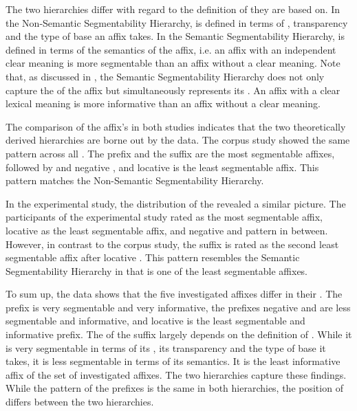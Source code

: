 The two hierarchies differ with regard to the definition of  they are based on. %
In the Non-Semantic Segmentability Hierarchy,  is defined in terms of , transparency and the type of base an affix takes. In the Semantic Segmentability Hierarchy,  is defined in terms of the semantics of the affix, i.e. an affix with an independent clear meaning is more segmentable than an affix without a clear meaning. Note that, as discussed in , the Semantic Segmentability Hierarchy does not only capture the  of the affix but simultaneously represents its . An affix with a clear lexical meaning is more informative than an affix without a clear meaning.


The comparison of the affix's  in both studies indicates that the two theoretically derived  hierarchies are borne out by the data.
 The corpus study showed the same  pattern across all .
 The prefix  and the suffix  are the most segmentable affixes, followed by  and negative , and locative  is the least segmentable affix. This pattern matches the Non-Semantic Segmentability Hierarchy.


In the experimental study, the distribution of the  revealed a similar picture. The participants of the experimental study rated  as the most segmentable affix, locative  as the least segmentable affix, and negative  and  pattern in between. However, in contrast to the corpus study, the suffix  is rated as the second least segmentable affix after locative . This pattern resembles the Semantic Segmentability Hierarchy in that  is one of the least segmentable affixes.

To sum up, the data shows that the five investigated affixes differ in their . The prefix  is very segmentable and very informative, the prefixes negative  and  are less segmentable and informative, and locative  is the least segmentable and informative prefix. The  of the suffix  largely depends on the definition of . While it is very segmentable in terms of its , its transparency and the type of base it takes, it is less segmentable in terms of its semantics. It is the least informative affix of the set of investigated affixes.
The two  hierarchies capture these findings. While the  pattern of the prefixes is the same in both hierarchies, the position of  differs between the two hierarchies. 


